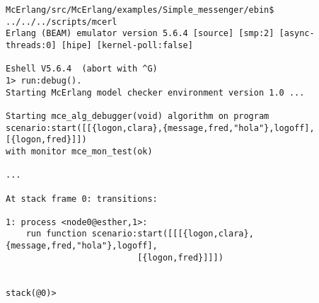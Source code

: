 \begin{verbatim}
McErlang/src/McErlang/examples/Simple_messenger/ebin$ ../../../scripts/mcerl 
Erlang (BEAM) emulator version 5.6.4 [source] [smp:2] [async-threads:0] [hipe] [kernel-poll:false]

Eshell V5.6.4  (abort with ^G)
1> run:debug().
Starting McErlang model checker environment version 1.0 ...

Starting mce_alg_debugger(void) algorithm on program
scenario:start([[{logon,clara},{message,fred,"hola"},logoff],[{logon,fred}]])
with monitor mce_mon_test(ok)

...

At stack frame 0: transitions:

1: process <node0@esther,1>:
    run function scenario:start([[[{logon,clara},{message,fred,"hola"},logoff],
                          [{logon,fred}]]])


stack(@0)> 
\end{verbatim}
